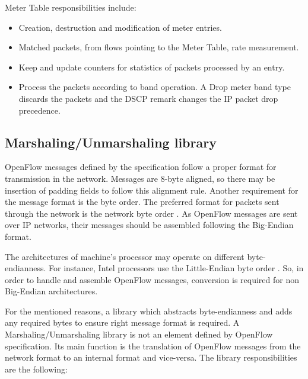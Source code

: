     Meter Table responsibilities include:

    \begin{itemize}
    
    \item Creation, destruction and modification of meter entries.
    
    \item Matched packets, from flows pointing to the Meter Table, rate measurement. 
    
    \item Keep and update counters for statistics of packets processed by an entry.
    
    \item Process the packets according to band operation. A Drop meter band type discards the packets and the DSCP remark changes the IP packet drop precedence. 
    
    \end{itemize}

    \subsection{Marshaling/Unmarshaling library}
    \label{(un)pack}
    OpenFlow messages defined by the specification follow a proper format for transmission in the network. Messages are 8-byte aligned, so there may be insertion of padding fields to follow this alignment rule. Another requirement for the message format is the byte order. The preferred format for packets sent through the network is the network byte order \cite{rfc1700}. As OpenFlow messages are sent over IP networks, their messages should be assembled following the Big-Endian format.
    
    The architectures of machine's processor may operate on different byte-endianness. For instance, Intel processors use the Little-Endian byte order \cite{little-endian}. So, in order to handle and assemble OpenFlow messages, conversion is required for non Big-Endian architectures.     
    
    For the mentioned reasons, a library which abstracts byte-endianness and adds any required bytes to ensure right message format is required. A Marshaling/Unmarshaling library is not an element defined by OpenFlow specification. Its main function is the translation of OpenFlow messages from the network format to an internal format and vice-versa. The library responsibilities are the following:
    
